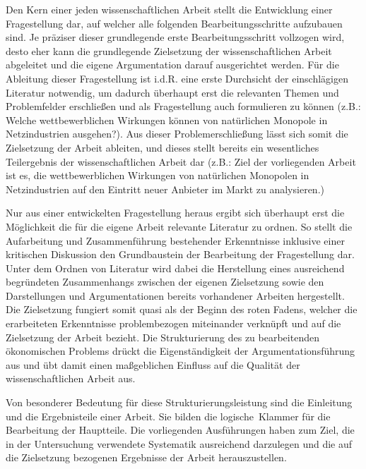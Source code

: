 \documentclass[a4paper, 12pt]{article}
\begin{document}
Den Kern einer jeden wissenschaftlichen Arbeit stellt die Entwicklung einer
Fragestellung dar, auf welcher alle folgenden Bearbeitungsschritte aufzubauen sind.
Je pr\"{a}ziser dieser grundlegende erste Bearbeitungsschritt vollzogen wird, desto eher
kann die grundlegende Zielsetzung der wissenschaftlichen Arbeit abgeleitet und die
eigene Argumentation darauf ausgerichtet werden. F\"{u}r die Ableitung dieser
Fragestellung ist i.d.R. eine erste Durchsicht der einschl\"{a}gigen Literatur
notwendig, um dadurch \"{u}berhaupt erst die relevanten Themen und Problemfelder
erschlie\ss en und als Fragestellung auch formulieren zu k\"{o}nnen (z.B.: Welche
wettbewerblichen Wirkungen k\"{o}nnen von nat\"{u}rlichen Monopole in Netzindustrien
ausgehen?). Aus dieser Problemerschlie\ss ung l\"{a}sst sich somit die Zielsetzung der
Arbeit ableiten, und dieses stellt bereits ein wesentliches Teilergebnis der
wissenschaftlichen Arbeit dar (z.B.: Ziel der vorliegenden Arbeit ist es, die
wettbewerblichen Wirkungen von nat\"{u}rlichen Monopolen in Netzindustrien auf den
Eintritt neuer Anbieter im Markt zu analysieren.)

Nur aus einer entwickelten Fragestellung heraus ergibt sich \"{u}berhaupt erst die
M\"{o}glichkeit die f\"{u}r die eigene Arbeit relevante Literatur zu ordnen. So stellt die
Aufarbeitung und Zusammenf\"{u}hrung bestehender Erkenntnisse inklusive einer kritischen
Diskussion den Grundbaustein der Bearbeitung der Fragestellung dar. Unter dem Ordnen
von Literatur wird dabei die Herstellung eines ausreichend begr\"{u}ndeten Zusammenhangs
zwischen der eigenen Zielsetzung sowie den Darstellungen und Argumentationen bereits
vorhandener Arbeiten hergestellt. Die Zielsetzung fungiert somit quasi als der
Beginn  des \glqq roten Fadens\grqq, welcher die erarbeiteten Erkenntnisse
problembezogen miteinander verkn\"{u}pft und auf die Zielsetzung der Arbeit bezieht. Die
Strukturierung des zu bearbeitenden \"{o}konomischen Problems dr\"{u}ckt die
Eigenst\"{a}ndigkeit der Argumentationsf\"{u}hrung aus und \"{u}bt damit einen ma\ss geblichen
Einfluss auf die Qualit\"{a}t der wissenschaftlichen Arbeit aus.

Von besonderer Bedeutung f\"{u}r diese Strukturierungsleistung sind die Einleitung und
die Ergebnisteile einer Arbeit. Sie bilden die \glqq logische\grqq\ Klammer f\"{u}r die
Bearbeitung der Hauptteile. Die vorliegenden Ausf\"{u}hrungen haben zum Ziel, die in der
Untersuchung verwendete Systematik ausreichend darzulegen und die auf die
Zielsetzung bezogenen Ergebnisse der Arbeit herauszustellen.
\end{document}
